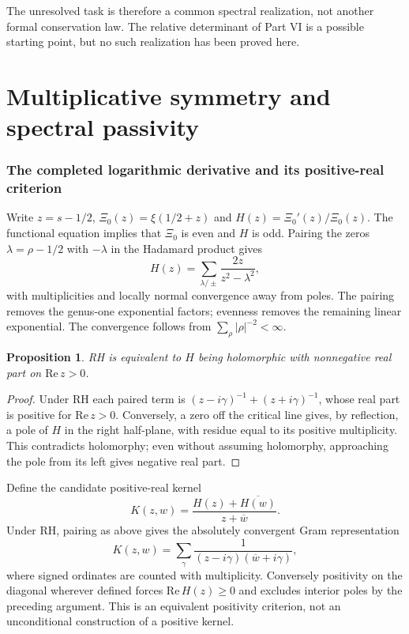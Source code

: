 \documentclass[11pt,a4paper]{article}
\newtheorem{proposition}{Proposition}[section]
\theoremstyle{definition}\newtheorem{definition}[proposition]{Definition}
\theoremstyle{remark}\newtheorem{remark}[proposition]{Remark}
\begin{document}
The unresolved task is therefore a common spectral realization, not another formal conservation law. The relative determinant of Part VI is a possible starting point, but no such realization has been proved here.

\part{Multiplicative symmetry and spectral passivity}

\section{The completed logarithmic derivative and its positive-real criterion}
Write $z=s-1/2$, $\Xi_0(z)=\xi(1/2+z)$ and $H(z)=\Xi_0'(z)/\Xi_0(z)$. The functional equation implies that $\Xi_0$ is even and $H$ is odd. Pairing the zeros $\lambda=\rho-1/2$ with $-\lambda$ in the Hadamard product gives
\[
H(z)=\sum_{\lambda/\pm}\frac{2z}{z^2-\lambda^2},
\]
with multiplicities and locally normal convergence away from poles. The pairing removes the genus-one exponential factors; evenness removes the remaining linear exponential. The convergence follows from $\sum_\rho|\rho|^{-2}<\infty$.

\begin{proposition}
RH is equivalent to $H$ being holomorphic with nonnegative real part on $\mathrm{Re}\,z>0$.
\end{proposition}
\begin{proof}
Under RH each paired term is $(z-i\gamma)^{-1}+(z+i\gamma)^{-1}$, whose real part is positive for $\mathrm{Re}\,z>0$. Conversely, a zero off the critical line gives, by reflection, a pole of $H$ in the right half-plane, with residue equal to its positive multiplicity. This contradicts holomorphy; even without assuming holomorphy, approaching the pole from its left gives negative real part.
\end{proof}

Define the candidate positive-real kernel
\[
K(z,w)=\frac{H(z)+\overline{H(w)}}{z+\overline w}.
\]
Under RH, pairing as above gives the absolutely convergent Gram representation
\[
K(z,w)=\sum_\gamma
\frac{1}{(z-i\gamma)(\overline w+i\gamma)},
\]
where signed ordinates are counted with multiplicity. Conversely positivity on the diagonal wherever defined forces $\mathrm{Re}\,H(z)\ge0$ and excludes interior poles by the preceding argument. This is an equivalent positivity criterion, not an unconditional construction of a positive kernel.
\end{document}
